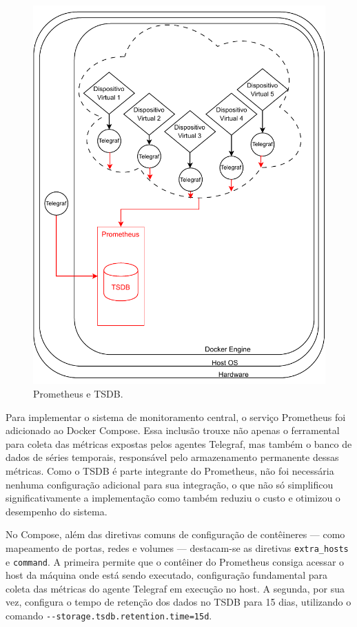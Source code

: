 \begin{figure}[H]
\centering
\includegraphics[scale=1]{Imagens/chap03/by-blocks/prometheus_diagram.pdf}
\caption{Prometheus e TSDB.}
\label{fig:DiagramaPrometheusTSDB}
\end{figure}

Para implementar o sistema de monitoramento central, o serviço Prometheus foi adicionado ao Docker Compose. Essa inclusão trouxe não apenas o ferramental para coleta das métricas expostas pelos agentes Telegraf, mas também o banco de dados de séries temporais, responsável pelo armazenamento permanente dessas métricas. Como o TSDB é parte integrante do Prometheus, não foi necessária nenhuma configuração adicional para sua integração, o que não só simplificou significativamente a implementação como também reduziu o custo e otimizou o desempenho do sistema.

No Compose, além das diretivas comuns de configuração de contêineres --- como mapeamento de portas, redes e volumes --- destacam-se as diretivas \verb|extra_hosts| e \verb|command|. A primeira permite que o contêiner do Prometheus consiga acessar o host da máquina onde está sendo executado, configuração fundamental para coleta das métricas do agente Telegraf em execução no host. A segunda, por sua vez, configura o tempo de retenção dos dados no TSDB para 15 dias, utilizando o comando \verb|--storage.tsdb.retention.time=15d|.

